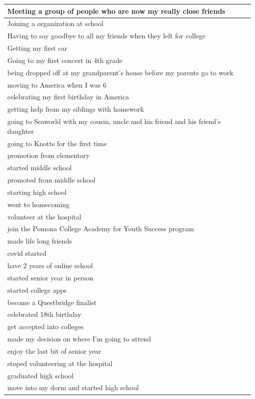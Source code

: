 \documentclass[
  .7em,
  letterpaper,
  DIV=11,
  numbers=noendperiod]{scrartcl}
\begin{document}
\begin{table}
\begin{tabular}{l}
\hline
Meeting a group of people who are now my really close friends\\
\hline
Joining a organization at school\\
\hline
Having to say goodbye to all my friends when they left for college\\
\hline
Getting my first car\\
\hline
Going to my first concert in 4th grade\\
\hline
being dropped off at my grandparent's house before my parents go to work\\
\hline
moving to America when I was 6\\
\hline
celebrating my first birthday in America\\
\hline
getting help from my siblings with homework\\
\hline
going to Seaworld with my cousin, uncle and his friend and his friend's daughter\\
\hline
going to Knotts for the first time\\
\hline
promotion from elementary\\
\hline
started middle school\\
\hline
promoted from middle school\\
\hline
starting high school\\
\hline
went to homecoming\\
\hline
volunteer at the hospital\\
\hline
join the Pomona College Academy for Youth Success program\\
\hline
made life long friends\\
\hline
covid started\\
\hline
have 2 years of online school\\
\hline
started senior year in person\\
\hline
started college apps\\
\hline
become a Questbridge finalist\\
\hline
celebrated 18th birthday\\
\hline
get accepted into colleges\\
\hline
made my decision on where I'm going to attend\\
\hline
enjoy the last bit of senior year\\
\hline
stoped volunteering at the hospital\\
\hline
graduated high school\\
\hline
move into my dorm and started high school\\

\end{tabular}
\end{table}
\end{document}
